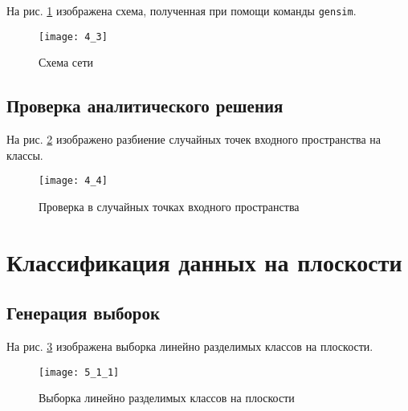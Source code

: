 
На рис. \ref{fig:4_3} изображена схема, полученная при помощи команды \verb+gensim+.

\begin{figure}[H]
\begin{center}
	\texttt{[image: 4\_3]}
	\caption{Схема сети}
	\label{fig:4_3}
\end{center}
\end{figure}

\subsection{Проверка аналитического решения}


На рис. \ref{fig:4_4} изображено разбиение случайных точек входного пространства на классы.

\begin{figure}[H]
\begin{center}
	\texttt{[image: 4\_4]}
	\caption{Проверка в случайных точках входного пространства}
	\label{fig:4_4}
\end{center}
\end{figure}

\section{Классификация данных на плоскости}

\subsection{Генерация выборок}


На рис. \ref{fig:5_1_1} изображена выборка линейно разделимых классов на плоскости.

\begin{figure}[H]
\begin{center}
	\texttt{[image: 5\_1\_1]}
	\caption{Выборка линейно разделимых классов на плоскости}
	\label{fig:5_1_1}
\end{center}
\end{figure}

